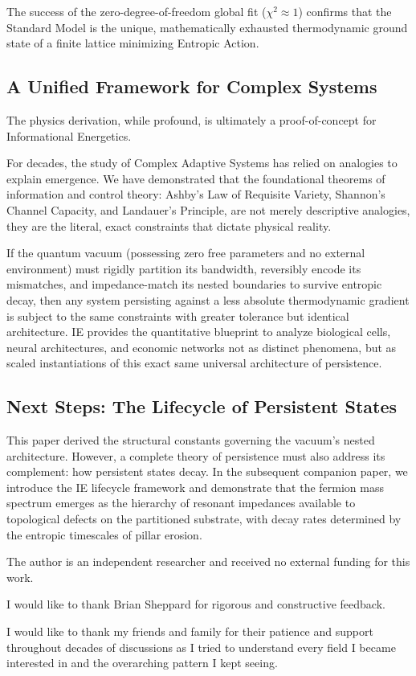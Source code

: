 The success of the zero-degree-of-freedom global fit ($\chi^2 \approx 1$) confirms that the Standard Model is the unique, mathematically exhausted thermodynamic ground state of a finite lattice minimizing Entropic Action.

\subsection{A Unified Framework for Complex Systems}

The physics derivation, while profound, is ultimately a proof-of-concept for Informational Energetics. 

For decades, the study of Complex Adaptive Systems has relied on analogies to explain emergence. We have demonstrated that the foundational theorems of information and control theory: Ashby’s Law of Requisite Variety, Shannon’s Channel Capacity, and Landauer’s Principle, are not merely descriptive analogies, they are the literal, exact constraints that dictate physical reality.

If the quantum vacuum (possessing zero free parameters and no external environment) must rigidly partition its bandwidth, reversibly encode its mismatches, and impedance-match its nested boundaries to survive entropic decay, then any system persisting against a less absolute thermodynamic gradient is subject to the same constraints with greater tolerance but identical architecture. IE provides the quantitative blueprint to analyze biological cells, neural architectures, and economic networks not as distinct phenomena, but as scaled instantiations of this exact same universal architecture of persistence. 

\subsection{Next Steps: The Lifecycle of Persistent States}

This paper derived the structural constants governing the vacuum's nested architecture. However, a complete theory of persistence must also address its complement: how persistent states decay. In the subsequent companion 
paper, we introduce the IE lifecycle framework and demonstrate that the fermion mass spectrum emerges as 
the hierarchy of resonant impedances available to topological defects on the partitioned substrate, with 
decay rates determined by the entropic timescales of pillar erosion.

\begin{acknowledgments}
The author is an independent researcher and received no external funding for this work. 

I would like to thank Brian Sheppard for rigorous and constructive feedback.

I would like to thank my friends and family for their patience and support throughout decades of discussions as I tried to understand every field I became interested in and the overarching pattern I kept seeing.
\end{acknowledgments}